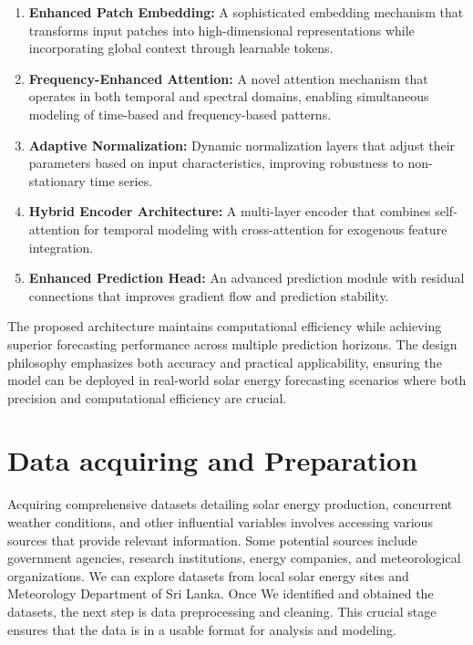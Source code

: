 \documentclass[12pt]{uomthesis}
\begin{document}
\begin{enumerate}
\item \textbf{Enhanced Patch Embedding:} A sophisticated embedding mechanism that transforms input patches into high-dimensional representations while incorporating global context through learnable tokens.

\item \textbf{Frequency-Enhanced Attention:} A novel attention mechanism that operates in both temporal and spectral domains, enabling simultaneous modeling of time-based and frequency-based patterns.

\item \textbf{Adaptive Normalization:} Dynamic normalization layers that adjust their parameters based on input characteristics, improving robustness to non-stationary time series.

\item \textbf{Hybrid Encoder Architecture:} A multi-layer encoder that combines self-attention for temporal modeling with cross-attention for exogenous feature integration.

\item \textbf{Enhanced Prediction Head:} An advanced prediction module with residual connections that improves gradient flow and prediction stability.
\end{enumerate}

The proposed architecture maintains computational efficiency while achieving superior forecasting performance across multiple prediction horizons. The design philosophy emphasizes both accuracy and practical applicability, ensuring the model can be deployed in real-world solar energy forecasting scenarios where both precision and computational efficiency are crucial.


\section{Data acquiring and Preparation}
Acquiring comprehensive datasets detailing solar energy production, concurrent weather conditions, and other influential variables involves accessing various sources that provide relevant information. Some potential sources include government agencies, research institutions, energy companies, and meteorological organizations. We can explore datasets from local solar energy sites and Meteorology Department of Sri Lanka. Once We identified and obtained the datasets, the next step is data preprocessing and cleaning. This crucial stage ensures that the data is in a usable format for analysis and modeling.
\end{document}

